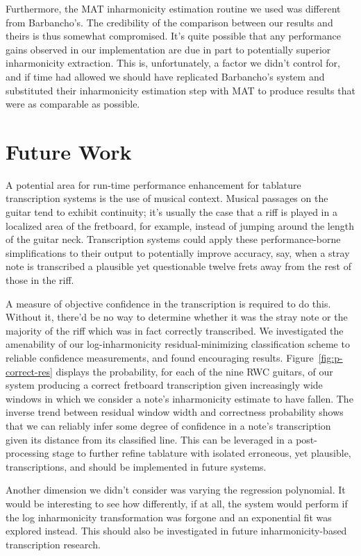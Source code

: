 \documentclass[12pt]{cmuthesis}
\begin{document}
Furthermore, the MAT inharmonicity estimation routine we used was different from Barbancho's. The credibility of the comparison between our results and theirs is thus somewhat compromised. It's quite possible that any performance gains observed in our implementation are due in part to potentially superior inharmonicity extraction. This is, unfortunately, a factor we didn't control for, and if time had allowed we should have replicated Barbancho's system and substituted their inharmonicity estimation step with MAT to produce results that were as comparable as possible.





\section{Future Work}
A potential area for run-time performance enhancement for tablature transcription systems is the use of musical context. Musical passages on the guitar tend to exhibit continuity; it's usually the case that a riff is played in a localized area of the fretboard, for example, instead of jumping around the length of the guitar neck. Transcription systems could apply these performance-borne simplifications to their output to potentially improve accuracy, say, when a stray note is transcribed a plausible yet questionable twelve frets away from the rest of those in the riff.

A measure of objective confidence in the transcription is required to do this. Without it, there'd be no way to determine whether it was the stray note or the majority of the riff which was in fact correctly transcribed. We investigated the amenability of our log-inharmonicity residual-minimizing classification scheme to reliable confidence measurements, and found encouraging results. Figure~\ref{fig:p-correct-res} displays the probability, for each of the nine RWC guitars, of our system producing a correct fretboard transcription given increasingly wide windows in which we consider a note's inharmonicity estimate to have fallen. The inverse trend between residual window width and correctness probability shows that we can reliably infer some degree of confidence in a note's transcription given its distance from its classified line. This can be leveraged in a post-processing stage to further refine tablature with isolated erroneous, yet plausible, transcriptions, and should be implemented in future systems.

Another dimension we didn't consider was varying the regression polynomial. It would be interesting to see how differently, if at all, the system would perform if the log inharmonicity transformation was forgone and an exponential fit was explored instead. This should also be investigated in future inharmonicity-based transcription research.
\end{document}
